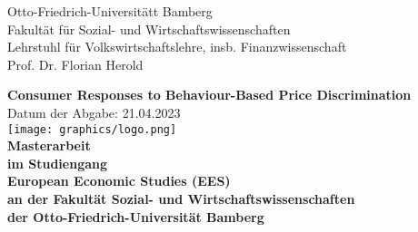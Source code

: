 \documentclass[a4paper, 11 pt, fleqn]{article}
\begin{document}
\begin{titlepage}
	\noindent
	Otto-Friedrich-Universitätt Bamberg\\
	Fakult\"at f\"ur Sozial- und Wirtschaftswissenschaften\\
	Lehrstuhl f\"ur Volkswirtschaftslehre, insb. Finanzwissenschaft\\
	Prof. Dr. Florian Herold
	
	\begin{center}
		\vspace{2 cm}
		\Large{
			\textbf{
		Consumer Responses to Behaviour-Based Price Discrimination
		}}\\ 
		\vspace{0.5 cm}
		\normalsize{Datum der Abgabe: 21.04.2023}\\
		\vspace{1 cm}
		\texttt{[image: graphics/logo.png]}\\
		\vspace{1 cm}	
		\textbf{Masterarbeit \\
		im Studiengang \\
		European Economic Studies (EES) \\
		an der Fakultät Sozial- und Wirtschaftswissenschaften \\
		der Otto-Friedrich-Universität Bamberg}\\
	\end{center}
	
	\vspace{5cm}
\end{titlepage}
\end{document}
